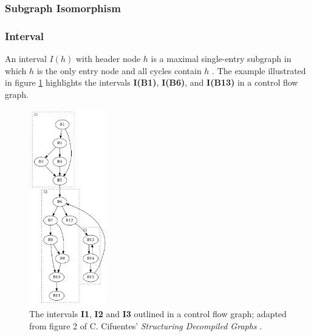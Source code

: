 
\subsubsection{Subgraph Isomorphism}
\label{app:subgraph_isomorphism}



\subsubsection{Interval}

An interval $I(h)$ with header node $h$ is a maximal single-entry subgraph in which $h$ is the only entry node and all cycles contain $h$ \cite{structuring_algorithm_for_decompilation}. The example illustrated in figure \ref{fig:interval} highlights the intervals \textbf{I(B1)}, \textbf{I(B6)}, and \textbf{I(B13)} in a control flow graph.

\begin{figure}[htbp]
	\centering
	\includegraphics[width=0.3\textwidth]{inc/appendices/vocabulary/interval.png}
	\caption{The intervals \textbf{I1}, \textbf{I2} and \textbf{I3} outlined in a control flow graph; adapted from figure 2 of C. Cifuentes' \textit{Structuring Decompiled Graphs} \cite{structuring_decompiled_graphs}.}
	\label{fig:interval}
\end{figure}

